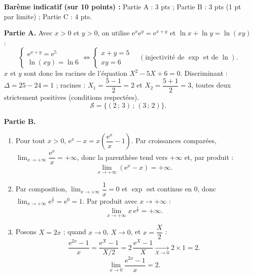 \documentclass[11pt]{article}
\begin{document}
\begin{corrige}
\textbf{Barème indicatif (sur 10 points) :} Partie A : 3 pts ; Partie B : 3 pts (1 pt par limite) ; Partie C : 4 pts.

\textbf{Partie A.} Avec $x > 0$ et $y > 0$, on utilise $\mathrm{e}^{x}\mathrm{e}^{y} = \mathrm{e}^{x+y}$ et $\ln x + \ln y = \ln(xy)$ :
\[ \begin{cases} \mathrm{e}^{x+y} = \mathrm{e}^{5} \\ \ln(xy) = \ln 6 \end{cases} \iff \begin{cases} x + y = 5 \\ xy = 6 \end{cases} \quad (\text{injectivité de } \exp \text{ et de } \ln). \]
$x$ et $y$ sont donc les racines de l'équation $X^{2} - 5X + 6 = 0$. Discriminant : $\Delta = 25 - 24 = 1$ ; racines : $X_{1} = \dfrac{5-1}{2} = 2$ et $X_{2} = \dfrac{5+1}{2} = 3$, toutes deux strictement positives (conditions respectées).
\[ \mathcal{S} = \{(2\,;\,3)\,;\,(3\,;\,2)\}. \]

\textbf{Partie B.}
\begin{enumerate}
\item Pour tout $x > 0$, $\mathrm{e}^{x} - x = x\left(\dfrac{\mathrm{e}^{x}}{x} - 1\right)$. Par croissances comparées, $\displaystyle\lim_{x \to +\infty} \dfrac{\mathrm{e}^{x}}{x} = +\infty$, donc la parenthèse tend vers $+\infty$ et, par produit :
\[ \lim_{x \to +\infty} \left(\mathrm{e}^{x} - x\right) = +\infty. \]
\item Par composition, $\displaystyle\lim_{x \to +\infty} \dfrac{1}{x} = 0$ et $\exp$ est continue en $0$, donc $\displaystyle\lim_{x \to +\infty} \mathrm{e}^{\frac{1}{x}} = \mathrm{e}^{0} = 1$. Par produit avec $x \to +\infty$ :
\[ \lim_{x \to +\infty} x\,\mathrm{e}^{\frac{1}{x}} = +\infty. \]
\item Posons $X = 2x$ ; quand $x \to 0$, $X \to 0$, et $x = \dfrac{X}{2}$ :
\[ \dfrac{\mathrm{e}^{2x} - 1}{x} = \dfrac{\mathrm{e}^{X} - 1}{X/2} = 2\,\dfrac{\mathrm{e}^{X} - 1}{X} \xrightarrow[X \to 0]{} 2 \times 1 = 2. \]
\[ \lim_{x \to 0} \dfrac{\mathrm{e}^{2x} - 1}{x} = 2. \]
\end{enumerate}


\end{corrige}
\end{document}
